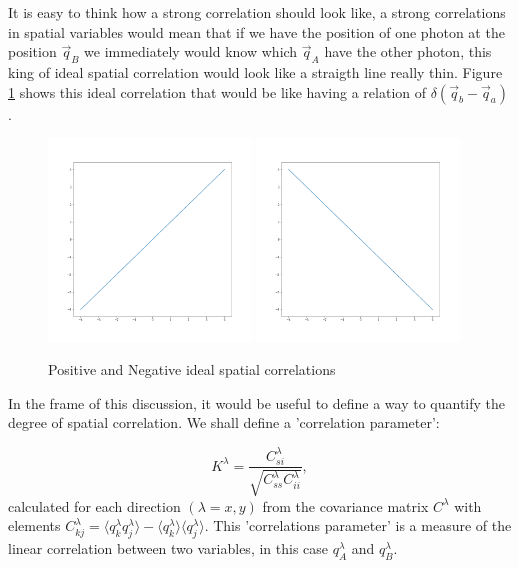 It is easy to think how a strong correlation should look like, a strong correlations in spatial variables would mean that if we have the position of one photon at the position 
$\vec{q}_B$ we immediately would know which $\vec{q}_A$ have the other photon, this king of ideal spatial correlation would look like a straigth line
really thin. Figure \ref{fig:idealCorre} shows this ideal correlation that  would be like having a relation of $\delta (\vec{q}_b -\vec{q}_a)$. 


\begin{figure}[h!]
\centering
{  \includegraphics[width=0.48\textwidth]{Figures/idealPositiveCorrelation.png} }
{  \includegraphics[width=0.48\textwidth]{Figures/idealNegativeCorrelation.png} }
\caption{Positive and Negative ideal spatial correlations}
 \label{fig:idealCorre}
\end{figure}

In the frame of this discussion, it would be useful to define a way to quantify the degree of spatial correlation.
We shall define a 'correlation parameter':

\begin{equation}
K^\lambda = \frac{C^\lambda_{si}}{\sqrt{C^\lambda_{ss}C^\lambda_{ii}}},
\end{equation}
calculated for each direction $(\lambda = x, y)$ from the covariance matrix $C^\lambda$ with elements $C^\lambda_{kj} = \langle q^\lambda_k q^\lambda_j \rangle - \langle q^\lambda_k \rangle \langle q^\lambda_j \rangle $.
This 'correlations parameter' is a measure of the linear correlation between two variables, in this case $q^{\lambda}_A$ and $q^{\lambda}_B$.

